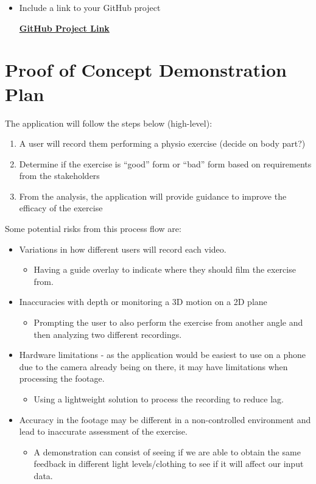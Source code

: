 \documentclass{article}
\begin{document}
\begin{itemize}
 \item Include a link to your GitHub project


 \href{https://github.com/users/M9Huynh/projects/2/views/1}{\textbf{GitHub Project Link}}


\end{itemize}


\section{Proof of Concept Demonstration Plan}

The application will follow the steps below (high-level):
\begin{enumerate}
  \item A user will record them performing a physio exercise (decide on body part?)
  \item Determine if the exercise is “good” form or “bad” form based on requirements from the stakeholders
  \item From the analysis, the application will provide guidance to improve the efficacy of the exercise
\end{enumerate}


Some potential risks from this process flow are:
\begin{itemize}
  \item Variations in how different users will record each video.
  \begin{itemize}
    \item Having a guide overlay to indicate where they should film the exercise from.
  \end{itemize}  
  \item Inaccuracies with depth or monitoring a 3D motion on a 2D plane
  \begin{itemize}
    \item Prompting the user to also perform the exercise from another angle and then analyzing two different recordings.
  \end{itemize}
  \item Hardware limitations - as the application would be easiest to use on a phone due to the camera already being on there, it may have limitations when processing the footage.
  \begin{itemize}
    \item Using a lightweight solution to process the recording to reduce lag.
  \end{itemize}
  \item Accuracy in the footage may be different in a non-controlled environment and lead to inaccurate assessment of the exercise. 
  \begin{itemize}
    \item A demonstration can consist of seeing if we are able to obtain the same feedback in different light levels/clothing to see if it will affect our input data.
  \end{itemize} 
\end{itemize}
\end{document}
